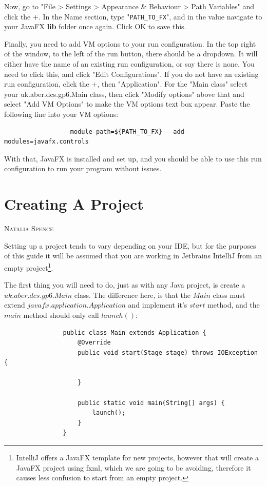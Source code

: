\documentclass[a4paper]{report}
\makeatletter
\newcommand{\sectionauthor}[1]{%
	{\parindent0pt\vspace*{0pt}%
		\linespread{1.1}\large\scshape#1%
		\par\nobreak\vspace*{10pt}}
	\@afterheading%
}
\makeatother
\begin{document}
			Now, go to "File > Settings > Appearance \& Behaviour > Path Variables" and click the $+$. In the Name section, type "\lstinline{PATH_TO_FX}", and in the value navigate to your JavaFX \textbf{lib} folder once again. Click OK to save this.
			
			Finally, you need to add VM options to your run configuration. In the top right of the window, to the left of the run button, there should be a dropdown. It will either have the name of an existing run configuration, or say there is none. You need to click this, and click "Edit Configurations". If you do not have an existing run configuration, click the $+$, then "Application". For the "Main class" select your uk.aber.dcs.gp6.Main class, then click "Modify options" above that and select "Add VM Options" to make the VM options text box appear. Paste the following line into your VM options:
			
			\begin{lstlisting}
				--module-path=${PATH_TO_FX} --add-modules=javafx.controls
			\end{lstlisting}
			
			With that, JavaFX is installed and set up, and you should be able to use this run configuration to run your program without issues.			
		
		\section{Creating A Project}\label{sec:creating a project}
		\sectionauthor{Natalia Spence}
		
			Setting up a project tends to vary depending on your IDE, but for the purposes of this guide it will be assumed that you are working in Jetbrains IntelliJ from an empty project\footnote{IntelliJ offers a JavaFX template for new projects, however that will create a JavaFX project using fxml, which we are going to be avoiding, therefore it causes less confusion to start from an empty project.}.
		
			The first thing you will need to do, just as with any Java project, is create a $uk.aber.dcs.gp6.Main$ class. The difference here, is that the $Main$ class must extend $javafx.application.Application$ and implement it's $start$ method, and the $main$ method should only call $launch()$:
			
			\begin{lstlisting}
				public class Main extends Application {
					@Override
					public void start(Stage stage) throws IOException {
						
					}
					
					public static void main(String[] args) {
						launch();
					}
				}
			\end{lstlisting}
			
\end{document}
